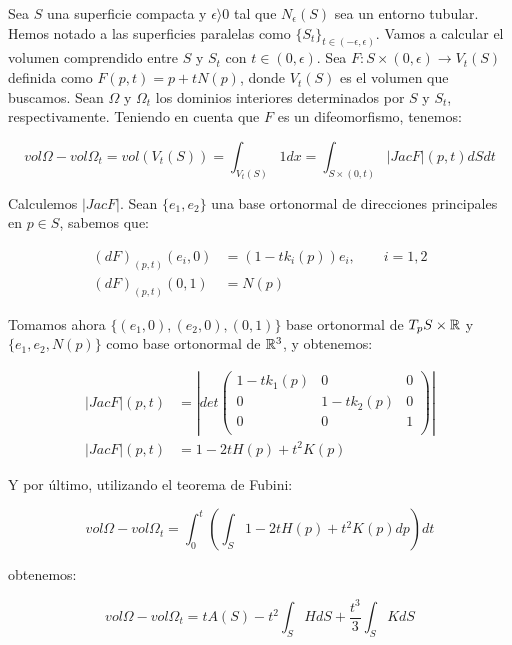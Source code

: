 \begin{remark}
Sea $S$ una superficie compacta y $\epsilon  \rangle  0$ tal que $N_\epsilon(S)$ sea un entorno tubular. Hemos notado a las superficies paralelas como $\{S_t\}_{t \in (-\epsilon, \epsilon)}$. Vamos a calcular el volumen comprendido entre $S$ y $S_t$ con $t\in (0, \epsilon)$. Sea $F: S \times (0, \epsilon) \longrightarrow V_t(S)$ definida como $F(p, t) = p + tN(p)$, donde $V_t(S)$ es el volumen que buscamos. Sean $\Omega$ y $\Omega_t$ los dominios interiores determinados por $S$ y $S_t$, respectivamente. Teniendo en cuenta que $F$ es un difeomorfismo, tenemos:

\begin{equation*}
    vol \Omega - vol \Omega_t = vol (V_t(S)) = \int_{V_t(S)} 1dx = \int_{S \times (0,t)} |JacF|(p,t)dSdt
\end{equation*}

Calculemos $|Jac F|$. Sean $\{e_1, e_2\}$ una base ortonormal de direcciones principales en $p \in S$, sabemos que:

\begin{align*}
    (dF)_{(p,t)}(e_i,0) &= (1-tk_i(p))e_i, \qquad i = 1,2 \\
    (dF)_{(p,t)}(0,1) &= N(p)
\end{align*}

Tomamos ahora $\{(e_1,0), (e_2,0), (0,1)\}$ base ortonormal de $T_pS \times \mathbb{R}$ y $\{e_1, e_2, N(p)\}$ como base ortonormal de $\mathbb{R}^3$, y obtenemos:

\begin{align*}
    |Jac F|(p,t) &= \left|
  det \left( {\begin{array}{ccc}
   1 - tk_1(p) & 0 & 0 \\
   0 & 1-tk_2(p) & 0 \\
   0 & 0 & 1 \\
  \end{array} } \right) \right| \\
  |Jac F|(p,t) &= 1 - 2tH(p) + t^2K(p)
\end{align*}

Y por último, utilizando el teorema de Fubini:

\begin{equation*}
    vol \Omega - vol \Omega_t = \int_0^t \left( \int_{S} 1-2tH(p)+t^2K(p) dp \right) dt
\end{equation*}

obtenemos:

\begin{equation}\label{volumeparallelsurface}
    vol \Omega - vol \Omega_t = tA(S) - t^2\int_S HdS + \frac{t^3}{3}\int_S KdS
\end{equation}
\end{remark}

